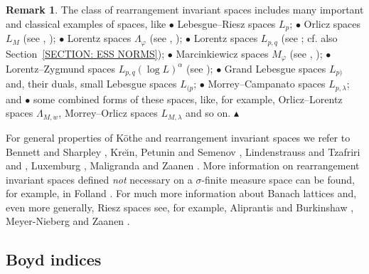 \documentclass[11pt]{amsart}
\theoremstyle{definition}
\theoremstyle{definition}
\theoremstyle{definition}
\theoremstyle{definition}
\theoremstyle{definition}
\theoremstyle{definition}
\newtheorem{remark}[theorem]{Remark}
\theoremstyle{definition}
\theoremstyle{definition}
\numberwithin{equation}{section}
\numberwithin{equation}{section}
\numberwithin{equation}{section}
\theoremstyle{definition}
\theoremstyle{definition}
\theoremstyle{definition}
\theoremstyle{definition}
\theoremstyle{definition}
\theoremstyle{definition}
\newcommand\xqed[1]{%
	\leavevmode\unskip\penalty9999 \hbox{}\nobreak\hfill
	\quad\hbox{#1}}
\newcommand\demo{\xqed{{\Large $\blacktriangle$}}}
\begin{document}
\begin{remark}
	The class of rearrangement invariant spaces includes many important and classical examples of spaces, like
		$\bullet$ Lebesgue--Riesz spaces $L_p$;
		$\bullet$ Orlicz spaces $L_M$ (see \cite[\S4.8]{BS88}, \cite[\S3]{Mal83});
		$\bullet$ Lorentz spaces $\Lambda_{\varphi}$ (see \cite[Definition~5.12, pp.~71--72]{BS88}, \cite[p.~107]{KPS82});
		$\bullet$ Lorentz spaces $L_{p,q}$ (see \cite[Definition~2.b.8, p.~142]{LT79}; cf. also Section~\ref{SECTION: ESS NORMS});
		$\bullet$ Marcinkiewicz spaces $M_{\varphi}$ (see \cite[Definition~5.7, p.~69]{BS88}, \cite[p.~114]{KPS82});
		$\bullet$ Lorentz--Zygmund spaces $L_{p,q}(\log L)^{\alpha}$ (see \cite[Definition~6.13, p.~253]{BS88});
		$\bullet$ Grand Lebesgue spaces $L_{p)}$ and, their duals, small Lebesgue spaces $L_{(p}$;
		$\bullet$ Morrey--Campanato spaces $L_{p,\lambda}$;
		and
		$\bullet$ some combined forms of these spaces, like, for example, Orlicz--Lorentz spaces $\Lambda_{M,w}$, Morrey--Orlicz spaces $L_{M,\lambda}$ and so on.
	\demo
\end{remark}

For general properties of K{\" o}the and rearrangement invariant spaces we refer to Bennett and Sharpley \cite{BS88},
Kre{\u \i}n, Petunin and Semenov \cite{KPS82}, Lindenstrauss and Tzafriri \cite{LT77} and \cite{LT79}, Luxemburg \cite{Lux67}, Maligranda \cite{Ma89}
and Zaanen \cite[Chapter~15]{Zaa67}.
More information on rearrangement invariant spaces defined {\it not} necessary on a $\sigma$-finite measure space can be found, for example, in Folland \cite{Fol99}.
For much more information about Banach lattices and, even more generally, Riesz spaces see, for example, Aliprantis and Burkinshaw \cite{AB85},
Meyer-Nieberg \cite{MN91} and Zaanen \cite{Za83}.

\subsection{Boyd indices}
\end{document}
